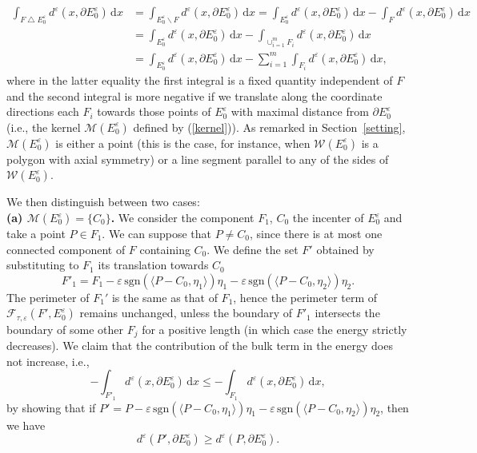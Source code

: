 \documentclass{interact}
\numberwithin{equation}{section}
\theoremstyle{definition}
\renewcommand{\epsilon}{\varepsilon}
\def\e{\epsilon}
\begin{document}
\begin{equation*}
\begin{split}
\int_{F\bigtriangleup E_0^\e}d^\epsilon(x,\partial E_0^\e)\,\mathrm{d}x&=\int_{E_0^\e\backslash F}d^\epsilon(x,\partial E_0^\e)\,\mathrm{d}x=\int_{E_0^\e}d^\epsilon(x,\partial E_0^\e)\,\mathrm{d}x-\int_{F}d^\epsilon(x,\partial E_0^\e)\,\mathrm{d}x\\
&=\int_{E_0^\e}d^\epsilon(x,\partial E_0^\e)\,\mathrm{d}x-\int_{\cup_{i=1}^mF_i}d^\epsilon(x,\partial E_0^\e)\,\mathrm{d}x\\
&=\int_{E_0^\e}d^\epsilon(x,\partial E_0^\e)\,\mathrm{d}x-\sum_{i=1}^m\int_{F_i}d^\epsilon(x,\partial E_0^\e)\,\mathrm{d}x,
\end{split}
\end{equation*}
where in the latter equality the first integral is a fixed quantity independent of $F$ and the second integral is more negative if we translate along the coordinate directions each $F_i$ towards those points of $E^\epsilon_0$ with maximal distance from $\partial E^\epsilon_0$ (i.e., the kernel $\mathcal{M}(E^\epsilon_0)$ defined by (\ref{kernel})). As remarked in Section~\ref{setting}, $\mathcal{M}(E^\epsilon_0)$ is either a point (this is the case, for instance, when $\mathcal{W}(E^\epsilon_0)$ is a polygon with axial symmetry) or a line segment parallel to any of the sides of $\mathcal{W}(E^\epsilon_0)$.

We then distinguish between two cases:\\
{\bf (a) $\mathcal{M}(E^\epsilon_0)=\{C_0\}$.} We consider the component $F_1$, $C_0$ the incenter of $E^\epsilon_0$ and take a point $P\in F_1$. We can suppose that $P\neq C_0$, since there is at most one connected component of $F$ containing $C_0$. We define the set $F'$ obtained by substituting to $F_1$ its translation towards $C_0$ 
\begin{equation}
F'_1=F_1-\epsilon\,\mbox{sgn}(\langle P-C_0,\eta_1\rangle)\eta_1-\epsilon\,\mbox{sgn}(\langle P-C_0,\eta_2\rangle)\eta_2.
\label{translation1}
\end{equation}
The perimeter of $F_1'$ is the same as that of $F_1$, hence the perimeter term of $\mathcal{F}_{\tau,\epsilon}(F',E^\epsilon_0)$ remains unchanged, unless the boundary of $F'_1$ intersects the boundary of some other $F_j$ for a positive length (in which case the energy strictly decreases). We claim that the contribution of the bulk term in the energy does not increase, i.e.,
\begin{equation}
-\int_{F'_1}d^\epsilon(x,\partial E_0^\e)\,\mathrm{d}x\leq -\int_{F_1}d^\epsilon(x,\partial E_0^\e)\,\mathrm{d}x,
\label{estimate}
\end{equation}
by showing that if $P'=P-\epsilon\,\mbox{sgn}(\langle P-C_0,\eta_1\rangle)\eta_1-\epsilon\,\mbox{sgn}(\langle P-C_0,\eta_2\rangle)\eta_2$, then we have 
\begin{equation*}
d^\epsilon(P',\partial E_0^\e)\geq d^\epsilon(P,\partial E_0^\e).
\end{equation*}
\end{document}
